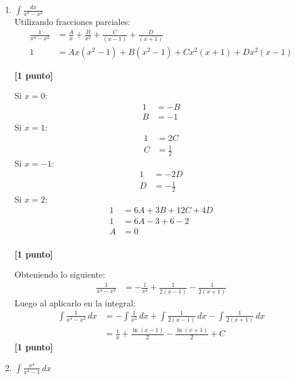 \documentclass[a4paper,10pt]{article}
\newcommand{\dis}{\displaystyle}
\begin{document}
\begin{enumerate}
\item $\dis \int \frac{dx}{x^4-x^2}$\\

Utilizando fracciones parciales:
\begin{align*}
 \dis  \frac{1}{x^4-x^2}  &=  \dis  \frac{A}{x} + \dis  \frac{B}{x^2} + \dis  \frac{C}{(x-1)} + \dis  \frac{D}{(x+1)}  \\
 \dis  1  &=  \dis  Ax(x^2-1)+ \dis  B(x^2-1) + \dis  Cx^2(x+1) + \dis  Dx^2(x-1)
\end{align*}

\dotfill \textbf{[1 punto]}

Si $x=0$:
\begin{align*}
 \dis 1  &=  \dis  -B \\
 \dis B  &=  \dis  -1
\end{align*}
Si $x=1$:
\begin{align*}
 \dis 1  &=  \dis  2C \\
 \dis C  &=  \dis  \frac{1}{2}
\end{align*}
Si $x=-1$:
\begin{align*}
 \dis 1  &=  \dis  -2D \\
 \dis D  &=  \dis  -\frac{1}{2}
\end{align*}
Si $x=2$:
\begin{align*}
 \dis 1  &=  \dis  6A + 3B + 12C + 4D \\
 \dis 1  &=  \dis  6A - 3 + 6 - 2 \\
 \dis A  &=  \dis  0 \\
\end{align*}

\dotfill \textbf{[1 punto]}

Obteniendo lo siguiente:
\begin{align*}
 \dis  \frac{1}{x^4-x^2}  &=  -\dis  \frac{1}{x^2} + \dis  \frac{1}{2(x-1)} - \dis  \frac{1}{2(x+1)}
\end{align*}
Luego al aplicarlo en la integral:
\begin{align*}
  \dis \int  \frac{1}{x^4-x^2} \, dx &=  -\dis \int \frac{1}{x^2}\, dx + \dis \int \frac{1}{2(x-1)}\, dx - \dis \int \frac{1}{2(x+1)}\, dx   \\
  &=  \dis \frac{1}{x} + \frac{\ln (x-1)}{2} - \frac{\ln (x+1)}{2} + C
\end{align*}
\dotfill \textbf{[1 punto]}


\newpage
\item $\dis \int \frac{x^4}{x^4-1}\, dx$\\


\end{enumerate}
\end{document}
